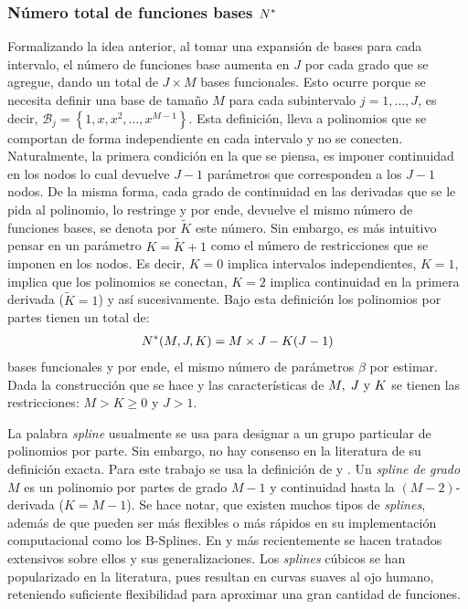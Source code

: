 \documentclass[../Main/Main.tex]{subfiles}
\begin{document}
\subsubsection*{Número total de funciones bases $N^*$}
Formalizando la idea anterior, al tomar una expansión de bases para cada intervalo, el número de funciones base aumenta en $J$ por cada grado que se agregue, dando un total de $J\times  M$ bases funcionales. Esto ocurre porque se necesita definir una base de tamaño $M$ para cada subintervalo $j = 1,\ldots,J$, es decir, $\mathcal{B}_j = \left\{1,x,x^2,\ldots,x^{M-1}\right\}$. Esta definición, lleva a polinomios que se comportan de forma independiente en cada intervalo y no se conecten. Naturalmente, la primera condición en la que se piensa, es imponer continuidad en los nodos lo cual devuelve $J-1$ parámetros que corresponden a los $J-1$ nodos. De la misma forma, cada grado de continuidad en las derivadas que se le pida al polinomio, lo restringe y por ende, devuelve el mismo número de funciones bases, se denota por $\tilde{K}$ este número. Sin embargo, es más intuitivo pensar en un parámetro $K = \tilde{K} + 1$ como el número de restricciones que se imponen en los nodos. Es decir, $K = 0$ implica intervalos independientes, $K = 1$, implica que los polinomios se conectan, $K = 2$ implica continuidad en la primera derivada ($\tilde{K} = 1$) y así sucesivamente. Bajo esta definición los polinomios por partes tienen un total de:
\begin{align}
	N^*(M,J,K) = M\times J - K(J-1) \label{ec:NEstrella}
\end{align}
bases funcionales y por ende, el mismo número de parámetros $\beta$ por estimar. Dada la construcción que se hace y las características de $M,\;J\text{ y }K$ se tienen las restricciones: $M > K \geq 0 $ y $J > 1$.

La palabra \textit{spline} usualmente se usa para designar a un grupo particular de polinomios por parte. Sin embargo, no hay consenso en la literatura de su definición exacta. Para este trabajo se usa la definición de \citet{wasserman2007all} y \citet{hastie2008elements}.  Un \textit{spline de grado $M$} es un polinomio por partes de grado $M-1$ y continuidad hasta la $(M-2)$-derivada ($K = M - 1$). Se hace notar, que existen muchos tipos de \textit{splines}, además de que pueden ser más flexibles o más rápidos en su implementación computacional como los B-Splines. En \citet{deboor1978splines} y más recientemente \citet{wahba1990splines} se hacen tratados extensivos sobre ellos y sus generalizaciones. Los \textit{splines} cúbicos se han popularizado en la literatura, pues resultan en curvas suaves al ojo humano, reteniendo suficiente flexibilidad para aproximar una gran cantidad de funciones.
\end{document}
